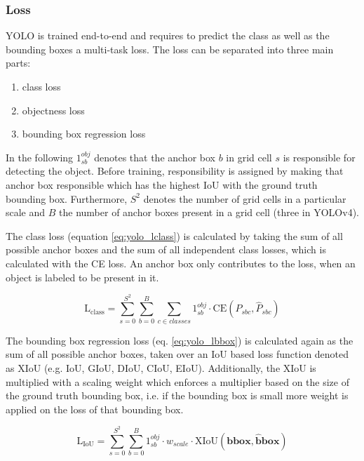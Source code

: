 \subsubsection{Loss}

\ac{YOLO} is trained end-to-end and requires to predict the class as well as the bounding boxes a multi-task loss.
The loss can be separated into three main parts:

\begin{enumerate}
    \item class loss
    \item objectness loss
    \item bounding box regression loss
\end{enumerate}


In the following $1_{sb}^{obj}$ denotes that the anchor box $b$ in grid cell $s$ is responsible for detecting the object.
Before training, responsibility is assigned by making that anchor box responsible which has the highest \ac{IoU} with the ground truth bounding box.
Furthermore, $S^2$ denotes the number of grid cells in a particular scale and $B$ the number of anchor boxes present in a grid cell (three in \ac{YOLOv4}).


The class loss (equation \ref{eq:yolo_lclass}) is calculated by taking the sum of all possible anchor boxes and the sum of all independent class losses, which is calculated with the \ac{CE} loss.
An anchor box only contributes to the loss, when an object is labeled to be present in it.

\begin{equation}
    \text{L}_{\text{class}} = \sum_{s=0}^{S^2} \sum_{b=0}^B \sum_{c \in classes} 1_{sb}^{obj} \cdot \text{CE}(P_{sbc}, \hat{P}_{sbc})
    \label{eq:yolo_lclass}
\end{equation}

The bounding box regression loss (eq. \ref{eq:yolo_lbbox}) is calculated again as the sum of all possible anchor boxes, taken over an \ac{IoU} based loss function denoted as XIoU (e.g. \ac{IoU}, \ac{GIoU}, \ac{DIoU}, \ac{CIoU}, \ac{EIoU}).
Additionally, the XIoU is multiplied with a scaling weight which enforces a multiplier based on the size of the ground truth bounding box, i.e. if the bounding box is small more weight is applied on the loss of that bounding box.

\begin{equation}
    \text{L}_{\text{IoU}} = \sum_{s=0}^{S^2}\sum_{b=0}^{B} 1^{obj}_{sb} \cdot w_{scale} \cdot \text{XIoU}(\mathbf{bbox}, \mathbf{\hat{b}box})
    \label{eq:yolo_lbbox}
\end{equation}

